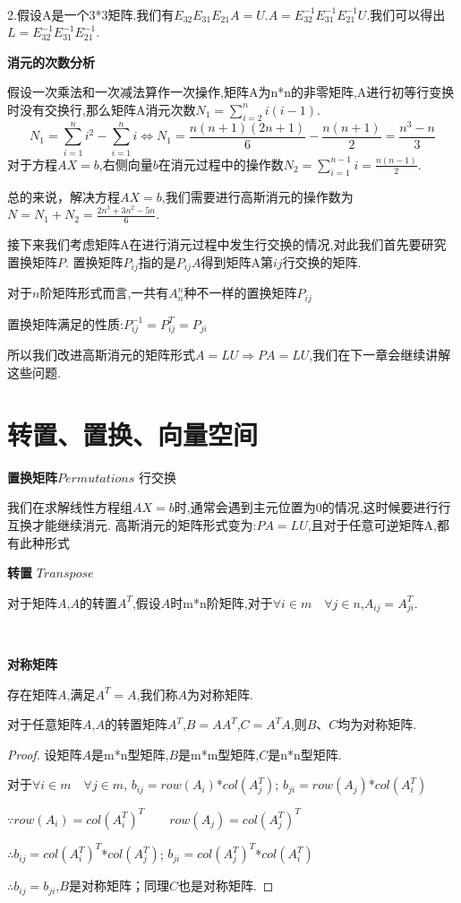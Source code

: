 \documentclass[oneside]{book}
\begin{document}
\hspace*{\fill}\

2.假设A是一个3*3矩阵.我们有$ E_{32}E_{31}E_{21}A=U $.$ A=E_{32}^{-1}E_{31}^{-1}E_{21}^{-1}U $.我们可以得出$ L=E_{32}^{-1}E_{31}^{-1}E_{21}^{-1} $.

\textbf{消元的次数分析}

假设一次乘法和一次减法算作一次操作,矩阵A为n*n的非零矩阵,A进行初等行变换时没有交换行,那么矩阵A消元次数$ N_{1}=\sum_{i=2}^{n}i(i-1) $.
$$N_{1}=\sum_{i=1}^{n}i^{2}-\sum_{i=1}^{n}i \Leftrightarrow N_{1}=\frac{n(n+1)(2n+1)}{6}-\frac{n(n+1)}{2}=\frac{n^{3}-n}{3}  $$
对于方程$ AX=b $,右侧向量$ b $在消元过程中的操作数$ N_{2}=\sum_{i=1}^{n-1}i=\frac{n(n-1)}{2} $.

总的来说，解决方程$ AX=b $,我们需要进行高斯消元的操作数为$ N=N_{1}+N_{2}=\frac{2n^{3}+3n^{2}-5n}{6} $.

接下来我们考虑矩阵A在进行消元过程中发生行交换的情况,对此我们首先要研究置换矩阵$P$.
置换矩阵$ P_{ij} $指的是$P_{ij}A$得到矩阵A第$ i j $行交换的矩阵.

对于$n$阶矩阵形式而言,一共有$A_{n}^{n}$种不一样的置换矩阵$P_{ij}$ 

置换矩阵满足的性质:$ P_{ij}^{-1}=P_{ij}^{T}=P_{ji} $

所以我们改进高斯消元的矩阵形式$ A=LU \Rightarrow PA=LU $,我们在下一章会继续讲解这些问题.
	\chapter{转置、置换、向量空间}
	\textbf{置换矩阵}$ Permutations $ 行交换
	
	我们在求解线性方程组$ AX=b $时,通常会遇到主元位置为0的情况,这时候要进行行互换才能继续消元.
	高斯消元的矩阵形式变为:$ PA=LU $,且对于任意可逆矩阵A,都有此种形式
	
	\textbf{转置} $ Transpose $
	
	对于矩阵$A$,$A$的转置$A^{T}$,假设$A$时m*n阶矩阵,对于$\forall i \in m \quad  \forall j\in n$,\qquad $A_{ij}=A^{T}_{ji}$.
	
	\hspace*{\fill}\
	
	\textbf{对称矩阵}
	
	存在矩阵$A$,满足$A^{T}=A$,我们称$A$为对称矩阵.
	
	对于任意矩阵$A$,$A$的转置矩阵$A^{T}$,$B=AA^{T}$,$C=A^{T}A$,则$B$、$C$均为对称矩阵.
	\begin{proof}
		设矩阵$A$是m*n型矩阵,$B$是m*m型矩阵,$C$是n*n型矩阵.
		
		对于$\forall i\in m \quad \forall j \in m$,
		$b_{ij}=row(A_{i})$*$col(A_{j}^{T})$;
		$b_{ji}=row(A_{j})$*$col(A_{i}^{T})$
		
		$\because row(A_{i})=col(A_{i}^{T})^{T}$$\qquad row(A_{j})=col(A_{j}^{T})^{T}$
		
		$\therefore b_{ij}=col(A_{i}^{T})^{T}$*$col(A_{j}^{T})$;\qquad
		$b_{ji}=col(A_{j}^{T})^{T}$*$col(A_{i}^{T})$
		
		$\therefore b_{ij}=b_{ji}$,$B$是对称矩阵；同理$C$也是对称矩阵.
	\end{proof}
	\hspace{\fill}\
	
\end{document}
